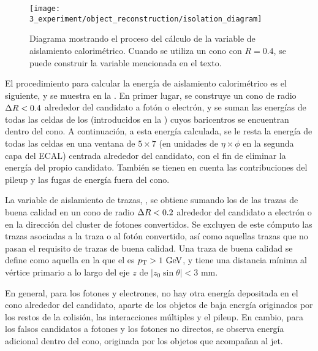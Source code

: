\begin{figure}[ht!]
    \centering
    \texttt{[image: 3\_experiment/object\_reconstruction/isolation\_diagram]}
    \caption{Diagrama mostrando el proceso del c\'alculo de la variable de aislamiento calorim\'etrico. Cuando se utiliza un cono con \(R=0.4\), se puede construir la variable \etconefo mencionada en el texto.}
    \label{fig:objects:egamma:iso:iso_diagram}
\end{figure}

El procedimiento para calcular la energía de aislamiento calorim\'etrico \etconefo es el siguiente, y se muestra en la \Fig{\ref{fig:objects:egamma:iso:iso_diagram}}. En primer lugar, se construye un cono de radio \(\Delta R<0.4\) alrededor del candidato a fotón o electrón, y se suman las energías de todas las celdas de los \topos (introducidos en la \Sect{\ref{subsec:objects:egamma:reco}}) cuyos baricentros se encuentran dentro del cono. A continuación, a esta energía calculada, se le resta la energía de todas las celdas en una ventana de \(5\times 7\) (en unidades de \(\eta \times \phi\) en la segunda capa del \ac{ECAL}) centrada alrededor del candidato, con el fin de eliminar la energía del propio candidato. También se tienen en cuenta las contribuciones del pileup y las fugas de energía fuera del cono.

La variable de aislamiento de trazas, \ptconetw, se obtiene sumando los \pt de las trazas de buena calidad en un cono de radio \(\Delta R<0.2\) alrededor del candidato a electrón o en la dirección del cluster de fotones convertidos.
Se excluyen de este cómputo las trazas asociadas a la traza o al fotón convertido, así como aquellas trazas que no pasan el requisito de trazas de buena calidad. Una traza de buena calidad se define como aquella en la que el \pt es \(p_{\text{T}}>1~\text{GeV}\), y tiene una distancia mínima al vértice primario a lo largo del eje \(z\) de \(|z_0 \sin \theta| < 3\) mm.

En general, para los fotones y electrones, no hay otra energía depositada en el cono alrededor del candidato, aparte de los objetos de baja energía originados por los restos de la colisión, las interacciones múltiples y el pileup. En cambio, para los falsos candidatos a fotones y los fotones no directos, se observa energía adicional dentro del cono, originada por los objetos que acompañan al jet.

